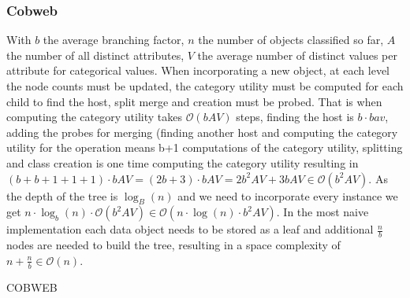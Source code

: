 \subsubsection{Cobweb}\label{\positionnumber}
With $b$ the average branching factor, $n$ the number of objects classified so far, $A$ the number of all distinct attributes, $V$ the average number of distinct values per attribute for categorical values. When incorporating a new object, at each level the node counts must be updated, the category utility must be computed for each child to find the host, split merge and creation must be probed. That is when computing the category utility takes $\mathcal{O}(bAV)$ steps, finding the host is $b \cdot bav$, adding the probes for merging (finding another host and computing the category utility for the operation means b+1 computations of the category utility, splitting and class creation is one time computing the category utility resulting in $(b + b + 1 + 1 + 1) \cdot bAV = (2b + 3) \cdot bAV = 2b^2AV + 3bAV \in \mathcal{O}(b^2AV)$. As the depth of the tree is $\log_B(n)$ and we need to incorporate every instance we get $n \cdot \log_b(n) \cdot \mathcal{O}(b^2AV) \in \mathcal{O}(n \cdot \log (n) \cdot b^2 AV)$. In the most naive implementation each data object needs to be stored as a leaf and additional $\frac{n}{b}$ nodes are needed to build the tree, resulting in a space complexity of $n + \frac{n}{b} \in \mathcal{O}(n)$.
\begin{algorithm}[htp]
    \hrulealg
\caption{COBWEB}\label{cobweb_}
\end{algorithm}
\clearpage

